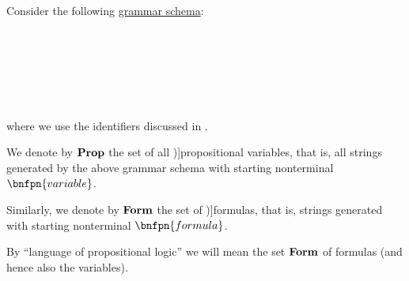 \begin{definition}\label{def:propositional_grammar_schema}
  Consider the following \hyperref[def:formal_grammar/schema]{grammar schema}:
  \begin{bnf*}
               {} \\
             {\bnftsq{\( \synvee \)} \bnfor \bnftsq{\( \synwedge \)} \bnfor \bnftsq{\( \synimplies \)} \bnfor \bnftsq{\( \syniff \)}} \\
                {\bnftsq{\( \syntop \)} \bnfor \bnftsq{\( \synbot \)} \bnfor} \\
     \\
     \\
  \end{bnf*}
  where we use the identifiers discussed in .

  \begin{thmenum}
     We denote by \( \operatorname{\mathbf{Prop}} \) the set of all \term[ru=пропозициональные переменные (\cite[43]{КолмогоровДрагалин2006})]{propositional variables}, that is, all strings generated by the above grammar schema with starting nonterminal \( \bnfpn{variable} \).

     Similarly, we denote by \( \operatorname{\mathbf{Form}} \) the set of \term[ru=формула (\cite[43]{КолмогоровДрагалин2006})]{formulas}, that is, strings generated with starting nonterminal \( \bnfpn{formula} \).

     By \enquote{language of propositional logic} we will mean the set \( \operatorname{\mathbf{Form}} \) of formulas (and hence also the variables).
  \end{thmenum}
\end{definition}
